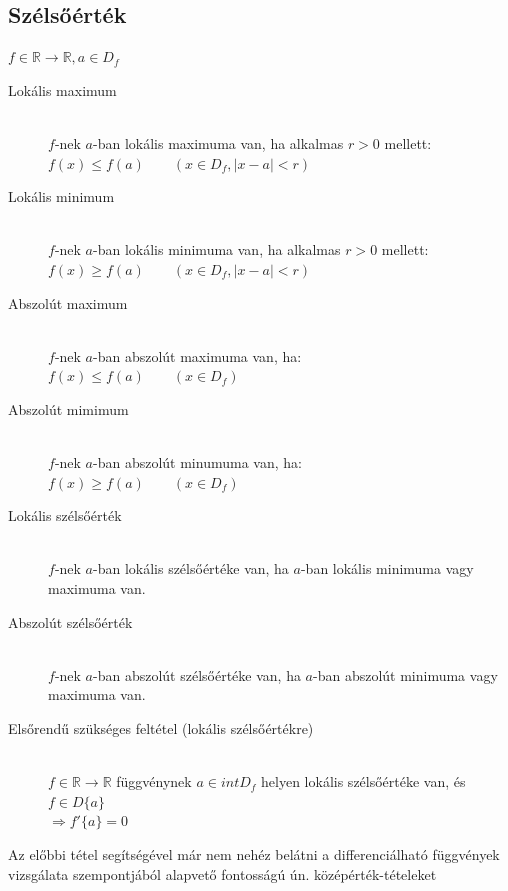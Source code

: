 \documentclass[margin=0px]{article}
\newcommand{\R}{\mathbb{R}}
\begin{document}
		\subsection{Szélsőérték}
			$ f \in \R \rightarrow \R, a \in D_f$
			\begin{description}		
				\item[Lokális maximum] \hfill \\
					$f$-nek $a$-ban lokális maximuma van, ha alkalmas $ r > 0$ mellett: \\
					$ f(x) \leq f(a) \qquad (x\in D_f, |x-a|<r)$
				\item[Lokális minimum] \hfill \\
					$f$-nek $a$-ban lokális minimuma van, ha alkalmas $ r > 0$ mellett: \\
					$ f(x) \geq f(a) \qquad (x\in D_f, |x-a|<r)$
				\item[Abszolút maximum] \hfill \\
					$f$-nek $a$-ban abszolút maximuma van, ha: \\
					$ f(x) \leq f(a) \qquad (x\in D_f)$
				\item[Abszolút mimimum] \hfill \\
					$f$-nek $a$-ban abszolút minumuma van, ha: \\
					$ f(x) \geq f(a) \qquad (x\in D_f)$				
				\item[Lokális szélsőérték] \hfill \\
					$f$-nek $a$-ban lokális szélsőértéke van, ha $a$-ban lokális minimuma vagy maximuma van.	
				\item[Abszolút szélsőérték] \hfill \\
					$f$-nek $a$-ban abszolút szélsőértéke van, ha $a$-ban abszolút minimuma vagy maximuma van.
				\item[Elsőrendű szükséges feltétel (lokális szélsőértékre)] \hfill \\
					$f \in \R \rightarrow \R$ függvénynek $ a \in intD_f $ helyen lokális szélsőértéke van, és $ f \in D\{a\}$ \\
					$ \Rightarrow f'\{a\} = 0 $
			\end{description}
			Az előbbi tétel segítségével már nem nehéz belátni a differenciálható függvények vizsgálata szempontjából alapvető fontosságú ún. középérték-tételeket
			
\end{document}
